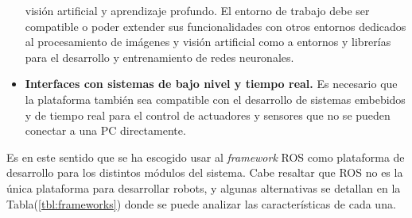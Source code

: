 \begin{itemize}
            visión artificial y aprendizaje profundo. El entorno de trabajo debe ser compatible o poder extender sus funcionalidades 
            con otros entornos dedicados al procesamiento de imágenes y visión artificial como a entornos y librerías 
            para el desarrollo y entrenamiento de redes neuronales. 
            \item \textbf{Interfaces con sistemas de bajo nivel y tiempo real.} Es necesario que la plataforma también 
            sea compatible con el desarrollo de sistemas embebidos y de tiempo real para el control de actuadores y 
            sensores que no se pueden conectar a una PC directamente.
        \end{itemize}

        Es en este sentido que se ha escogido usar al \textit{framework} ROS como plataforma de desarrollo para los distintos módulos 
        del sistema. Cabe resaltar que ROS no es la única plataforma para desarrollar robots, y algunas alternativas se detallan en la 
        Tabla(\ref{tbl:frameworks}) donde se puede analizar las características de cada una. 

